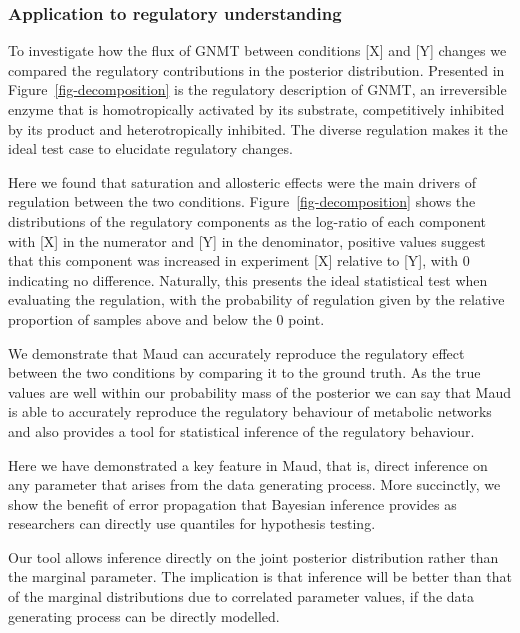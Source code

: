 \documentclass[journal=,manuscript=]{achemso}
\begin{document}
\hypertarget{application-to-regulatory-understanding}{%
\subsubsection{Application to regulatory
understanding}\label{application-to-regulatory-understanding}}

To investigate how the flux of GNMT between conditions {[}X{]} and
{[}Y{]} changes we compared the regulatory contributions in the
posterior distribution. Presented in Figure~\ref{fig-decomposition} is
the regulatory description of GNMT, an irreversible enzyme that is
homotropically activated by its substrate, competitively inhibited by
its product and heterotropically inhibited. The diverse regulation makes
it the ideal test case to elucidate regulatory changes.

Here we found that saturation and allosteric effects were the main
drivers of regulation between the two conditions.
Figure~\ref{fig-decomposition} shows the distributions of the regulatory
components as the log-ratio of each component with {[}X{]} in the
numerator and {[}Y{]} in the denominator, positive values suggest that
this component was increased in experiment {[}X{]} relative to {[}Y{]},
with 0 indicating no difference. Naturally, this presents the ideal
statistical test when evaluating the regulation, with the probability of
regulation given by the relative proportion of samples above and below
the 0 point.

We demonstrate that Maud can accurately reproduce the regulatory effect
between the two conditions by comparing it to the ground truth. As the
true values are well within our probability mass of the posterior we can
say that Maud is able to accurately reproduce the regulatory behaviour
of metabolic networks and also provides a tool for statistical inference
of the regulatory behaviour.

Here we have demonstrated a key feature in Maud, that is, direct
inference on any parameter that arises from the data generating process.
More succinctly, we show the benefit of error propagation that Bayesian
inference provides as researchers can directly use quantiles for
hypothesis testing.

Our tool allows inference directly on the joint posterior distribution
rather than the marginal parameter. The implication is that inference
will be better than that of the marginal distributions due to correlated
parameter values, if the data generating process can be directly
modelled.
\end{document}
